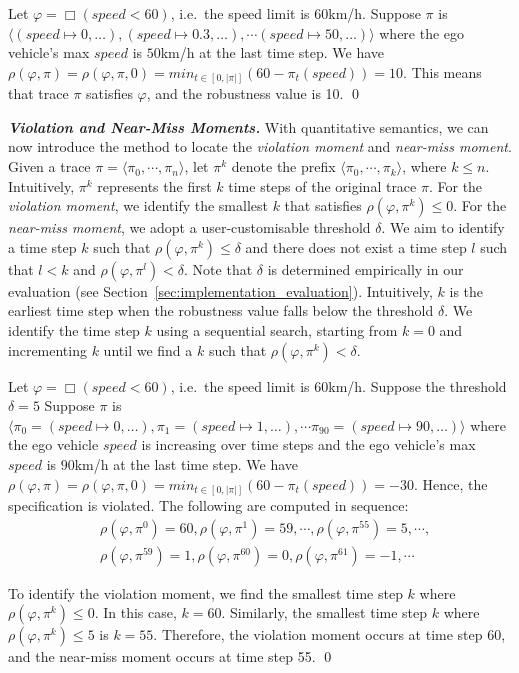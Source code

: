 \begin{example}
\label{example:robustness calculation}
Let $\varphi = \Box (speed < 60)$, i.e.~the speed limit is $60$km/h.
Suppose $\pi$ is $\langle (speed \mapsto 0, \dots), (speed \mapsto 0.3, \dots), \cdots  (speed \mapsto 50, \dots) \rangle$ where the ego vehicle's max $speed$ is $50$km/h at the last time step.
We have $\rho(\varphi, \pi) = \rho(\varphi, \pi, 0) = min_{t \in [0, |\pi|]} ( 60 - \pi_t(speed) ) = 10$.
This means that trace $\pi$ satisfies $\varphi$, and the robustness value is 10. 
\qed
\end{example}

\noindent \emph{\textbf{Violation and Near-Miss Moments.}}
\label{sec:Violation and Near-Miss Moment}
With quantitative semantics, we can now introduce the method to locate the \emph{violation moment} and \emph{near-miss moment}.
Given a trace $\pi = \langle \pi_0, \cdots, \pi_n \rangle$, let $\pi^k$ denote the prefix $\langle  \pi_0, \cdots, \pi_k \rangle$, where $k \leq n$. Intuitively, $\pi^k$ represents the first $k$ time steps of the original trace $\pi$.
For the \emph{violation moment}, we identify the smallest $k$ that satisfies $\rho(\varphi, \pi^k) \leq 0$.
For the \emph{near-miss moment}, we adopt a user-customisable threshold $\delta$. We aim to identify a time step $k$ such that $\rho(\varphi, \pi^k) \leq \delta$ and there does not exist a time step $l$ such that $l < k$ and $\rho(\varphi, \pi^l) < \delta$. Note that $\delta$ is determined empirically  in our evaluation (see Section~\ref{sec:implementation_evaluation}).
Intuitively, $k$ is the earliest time step when the robustness value falls below the threshold $\delta$. We identify the time step $k$ using a sequential search, starting from $k=0$ and incrementing $k$ until we find a $k$ such that $\rho(\varphi, \pi^k) < \delta$.

\begin{example}
\label{example:timestep location}
Let $\varphi = \Box (speed < 60)$, i.e.~the speed limit is $60$km/h. Suppose the threshold $\delta = 5$
Suppose $\pi$ is $\langle \pi_0 = (speed \mapsto 0, \dots), \pi_1 = (speed \mapsto 1, \dots), \cdots \pi_{90} = (speed \mapsto 90, \dots) \rangle$ where the ego vehicle $speed$ is increasing over time steps and the ego vehicle's max $speed$ is $90$km/h at the last time step.
We have $\rho(\varphi, \pi) = \rho(\varphi, \pi, 0) = min_{t \in [0, |\pi|]} ( 60 - \pi_t(speed) ) = -30$. Hence, the specification is violated. 
The following are computed in sequence:
\begin{align*}
    & \rho(\varphi, \pi^{0}) = 60, \rho(\varphi, \pi^1)  = 59, \cdots,
     \rho(\varphi, \pi^{55}) = 5, \cdots, \\
    & \rho(\varphi, \pi^{59}) = 1, \rho(\varphi, \pi^{60}) = 0,  
    \rho(\varphi, \pi^{61}) = -1, \cdots
\end{align*}

To identify the violation moment, we find the smallest time step $k$ where $\rho(\varphi, \pi^k) \leq 0$. In this case, $k = 60$. Similarly, the smallest time step $k$ where $\rho(\varphi, \pi^k) \leq 5$ is $k = 55$.
Therefore, the violation moment occurs at time step 60, and the near-miss moment occurs at time step 55.
\qed
\end{example}

